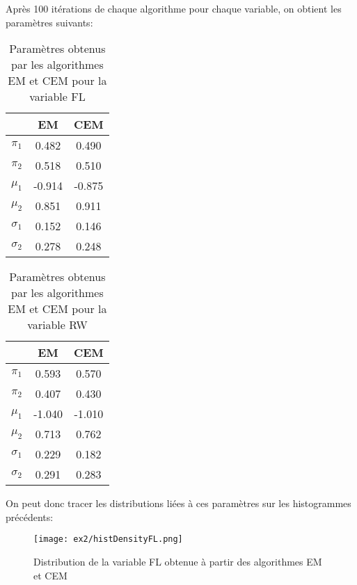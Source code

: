 \documentclass{article}
\begin{document}
\begin{multicols}{2}
Après 100 itérations de chaque algorithme pour chaque variable, on obtient les
paramètres suivants:

\begin{table}[H]
\centering
\captionsetup{justification=centering}
\caption{\label{tab:paramFL}Paramètres obtenus par les algorithmes EM et CEM pour la variable FL}
\begin{tabular}{|c|c|c|}
    \hline
    & EM & CEM \\
    \hline
    $\pi_1$ & 0.482 & 0.490 \\
    \hline
    $\pi_2$ & 0.518 & 0.510 \\
    \hline
    $\mu_1$ & -0.914 & -0.875 \\
    \hline
    $\mu_2$ & 0.851 & 0.911 \\
    \hline
    $\sigma_1$ & 0.152 & 0.146 \\
    \hline
    $\sigma_2$ & 0.278 & 0.248 \\
    \hline
\end{tabular}
\end{table}

\begin{table}[H]
\centering
\captionsetup{justification=centering}
\caption{\label{tab:paramRW}Paramètres obtenus par les algorithmes EM et CEM pour la variable RW}
\begin{tabular}{|c|c|c|}
    \hline
    & EM & CEM \\
    \hline
    $\pi_1$ & 0.593 & 0.570 \\
    \hline
    $\pi_2$ & 0.407 & 0.430 \\
    \hline
    $\mu_1$ & -1.040 & -1.010 \\
    \hline
    $\mu_2$ & 0.713 & 0.762 \\
    \hline
    $\sigma_1$ & 0.229 & 0.182 \\
    \hline
    $\sigma_2$ & 0.291 & 0.283 \\
    \hline
\end{tabular}
\end{table}

On peut donc tracer les distributions liées à ces paramètres sur les
histogrammes précédents:

\begin{figure}[H]
\begin{center}
    \texttt{[image: ex2/histDensityFL.png]}
    \centering
    \captionsetup{justification=centering}
    \caption{\label{fig:histDFL}Distribution de la variable FL obtenue à partir des algorithmes EM et CEM}
\end{center}
\end{figure}


\end{multicols}
\end{document}
